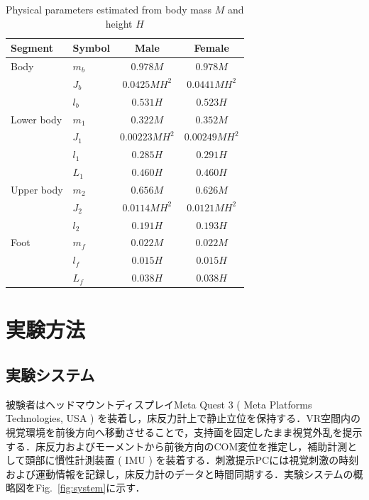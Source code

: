 \documentclass[a4paper,9pt,twocolumn]{ltjsarticle}
\begin{document}
\suppressfloats[t]
\begin{table}[t]
  \centering
  \caption{Physical parameters estimated from body mass $M$ and height $H$}
  \label{tab:physical-parameters}
  \footnotesize
  \setlength{\tabcolsep}{3.5pt}
  \begin{tabular}{@{}llcc@{}}
    \hline
    Segment & Symbol & Male & Female \\
    \hline
    Body & $m_b$ & $0.978M$ & $0.978M$ \\
         & $J_b$ & $0.0425MH^2$ & $0.0441MH^2$ \\
         & $l_b$ & $0.531H$ & $0.523H$ \\
    \hline
    Lower body & $m_1$ & $0.322M$ & $0.352M$ \\
         & $J_1$ & $0.00223MH^2$ & $0.00249MH^2$ \\
         & $l_1$ & $0.285H$ & $0.291H$ \\
         & $L_1$ & $0.460H$ & $0.460H$ \\
    \hline
    Upper body & $m_2$ & $0.656M$ & $0.626M$ \\
         & $J_2$ & $0.0114MH^2$ & $0.0121MH^2$ \\
         & $l_2$ & $0.191H$ & $0.193H$ \\
    \hline
    Foot & $m_f$ & $0.022M$ & $0.022M$ \\
         & $l_f$ & $0.015H$ & $0.015H$ \\
         & $L_f$ & $0.038H$ & $0.038H$ \\
    \hline
  \end{tabular}
\end{table}

\section{実験方法}

\subsection{実験システム}

被験者はヘッドマウントディスプレイMeta Quest 3 ( Meta Platforms Technologies, USA ) を装着し，床反力計上で静止立位を保持する．VR空間内の視覚環境を前後方向へ移動させることで，支持面を固定したまま視覚外乱を提示する．床反力およびモーメントから前後方向のCOM変位を推定し，補助計測として頭部に慣性計測装置 ( IMU ) を装着する．刺激提示PCには視覚刺激の時刻および運動情報を記録し，床反力計のデータと時間同期する．実験システムの概略図をFig.~\ref{fig:system}に示す．
\end{document}
